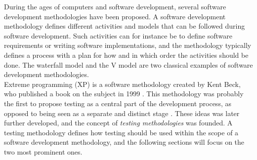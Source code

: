 
During the ages of computers and software development, several software
development methodologies have been proposed. A software development
methodology defines different activities and models that can be
followed during software development. Such activities can for instance
be to define software requirements or writing software implementations,
and the methodology typically defines a process with a plan for how and
in which order the activities should be done. The waterfall model and
the V model are two classical examples of software development
methodologies.\cite{article:sw_methodologies}\\

Extreme programming (XP) is a software methodology created by Kent Beck,
who published a book on the subject in 1999 \cite{wiki:xp}. This
methodology was probably the first to propose testing as a central part
of the development process, as opposed to being seen as a separate and
distinct stage \cite{article:sw_methodologies}. These ideas was later
further developed, and the concept of \emph{testing methodologies} was
founded. A testing methodology defines how testing should be used within
the scope of a software development methodology, and the following
sections will focus on the two most prominent ones.\\
